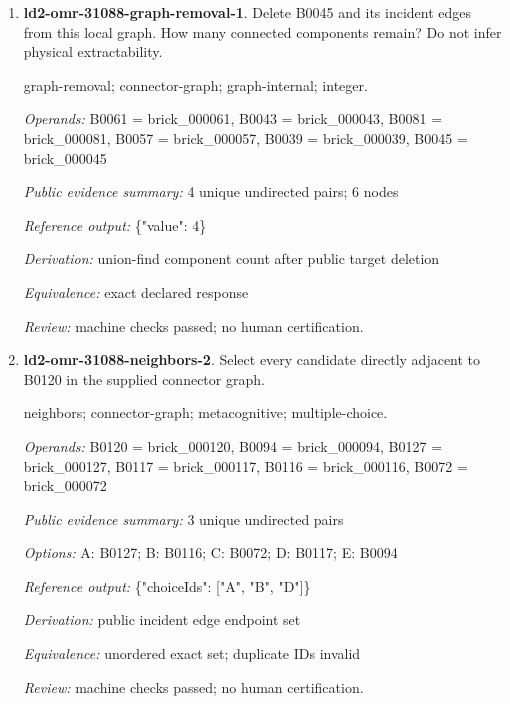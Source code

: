\begin{enumerate}
\par{\small neighbors; connector-graph; metacognitive; multiple-choice.\par\textit{Operands:} B0057 = brick\_000057, B0061 = brick\_000061, B0081 = brick\_000081, B0039 = brick\_000039, B0043 = brick\_000043, B0045 = brick\_000045\par\textit{Public evidence summary:} 4 unique undirected pairs\par\textit{Options:} A: B0057; B: B0061; C: B0043; D: B0081; E: B0039\par\textit{Reference output:} \{"choiceIds": ["A", "B", "C"]\}\par\textit{Derivation:} public incident edge endpoint set\par\textit{Equivalence:} unordered exact set; duplicate IDs invalid\par\textit{Review:} machine checks passed; no human certification.}
\item \textbf{ld2-omr-31088-graph-removal-1}. Delete B0045 and its incident edges from this local graph. How many connected components remain? Do not infer physical extractability.
\par{\small graph-removal; connector-graph; graph-internal; integer.\par\textit{Operands:} B0061 = brick\_000061, B0043 = brick\_000043, B0081 = brick\_000081, B0057 = brick\_000057, B0039 = brick\_000039, B0045 = brick\_000045\par\textit{Public evidence summary:} 4 unique undirected pairs; 6 nodes\par\textit{Reference output:} \{"value": 4\}\par\textit{Derivation:} union-find component count after public target deletion\par\textit{Equivalence:} exact declared response\par\textit{Review:} machine checks passed; no human certification.}
\item \textbf{ld2-omr-31088-neighbors-2}. Select every candidate directly adjacent to B0120 in the supplied connector graph.
\par{\small neighbors; connector-graph; metacognitive; multiple-choice.\par\textit{Operands:} B0120 = brick\_000120, B0094 = brick\_000094, B0127 = brick\_000127, B0117 = brick\_000117, B0116 = brick\_000116, B0072 = brick\_000072\par\textit{Public evidence summary:} 3 unique undirected pairs\par\textit{Options:} A: B0127; B: B0116; C: B0072; D: B0117; E: B0094\par\textit{Reference output:} \{"choiceIds": ["A", "B", "D"]\}\par\textit{Derivation:} public incident edge endpoint set\par\textit{Equivalence:} unordered exact set; duplicate IDs invalid\par\textit{Review:} machine checks passed; no human certification.}

\end{enumerate}
